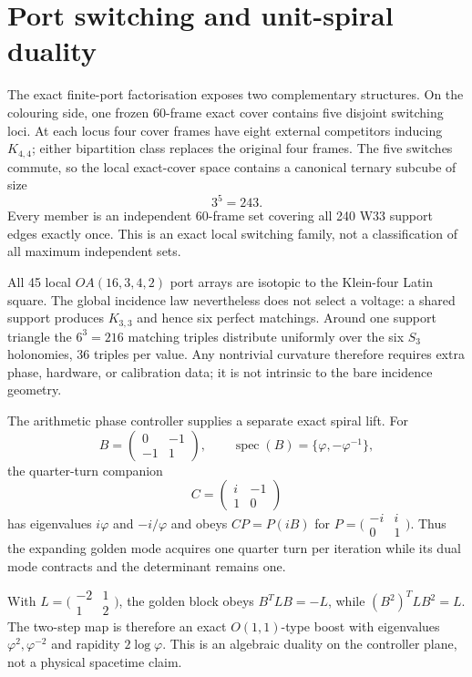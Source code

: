 \section{Port switching and unit-spiral duality}
\label{sec:port-spiral-3226}

The exact finite-port factorisation exposes two complementary structures. On the colouring side, one frozen 60-frame exact cover contains five disjoint switching loci. At each locus four cover frames have eight external competitors inducing $K_{4,4}$; either bipartition class replaces the original four frames. The five switches commute, so the local exact-cover space contains a canonical ternary subcube of size
\[
  3^5=243.
\]
Every member is an independent 60-frame set covering all 240 W33 support edges exactly once. This is an exact local switching family, not a classification of all maximum independent sets.

All 45 local $OA(16,3,4,2)$ port arrays are isotopic to the Klein-four Latin square. The global incidence law nevertheless does not select a voltage: a shared support produces $K_{3,3}$ and hence six perfect matchings. Around one support triangle the $6^3=216$ matching triples distribute uniformly over the six $S_3$ holonomies, 36 triples per value. Any nontrivial curvature therefore requires extra phase, hardware, or calibration data; it is not intrinsic to the bare incidence geometry.

The arithmetic phase controller supplies a separate exact spiral lift. For
\[
 B=\begin{pmatrix}0&-1\\-1&1\end{pmatrix},\qquad
 \operatorname{spec}(B)=\{\varphi,-\varphi^{-1}\},
\]
the quarter-turn companion
\[
 C=\begin{pmatrix}i&-1\\1&0\end{pmatrix}
\]
has eigenvalues $i\varphi$ and $-i/\varphi$ and obeys $CP=P(iB)$ for $P=\bigl(\begin{smallmatrix}-i&i\\0&1\end{smallmatrix}\bigr)$. Thus the expanding golden mode acquires one quarter turn per iteration while its dual mode contracts and the determinant remains one.

With $L=\bigl(\begin{smallmatrix}-2&1\\1&2\end{smallmatrix}\bigr)$, the golden block obeys $B^TLB=-L$, while $(B^2)^TLB^2=L$. The two-step map is therefore an exact $O(1,1)$-type boost with eigenvalues $\varphi^2,\varphi^{-2}$ and rapidity $2\log\varphi$. This is an algebraic duality on the controller plane, not a physical spacetime claim.


